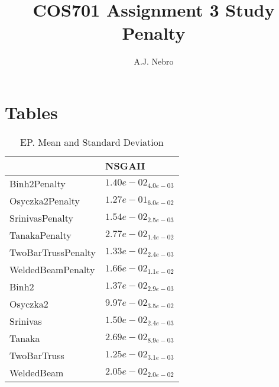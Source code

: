 \documentclass{article}
\title{COS701 Assignment 3 Study Penalty}
\author{A.J. Nebro}
\begin{document}
\maketitle
\section{Tables}

\begin{table}
\caption{EP. Mean and Standard Deviation}
\label{table: EP}
\centering
\begin{scriptsize}
\begin{tabular}{ll}
\hline &  NSGAII\\
\hline 
Binh2Penalty & \cellcolor{gray95}$  1.40e-02_{ 4.0e-03}$ \\
Osyczka2Penalty & \cellcolor{gray95}$  1.27e-01_{ 6.0e-02}$ \\
SrinivasPenalty & \cellcolor{gray95}$  1.54e-02_{ 2.5e-03}$ \\
TanakaPenalty & \cellcolor{gray95}$  2.77e-02_{ 1.4e-02}$ \\
TwoBarTrussPenalty & \cellcolor{gray95}$  1.33e-02_{ 2.4e-03}$ \\
WeldedBeamPenalty & \cellcolor{gray95}$  1.66e-02_{ 1.1e-02}$ \\
Binh2 & \cellcolor{gray95}$  1.37e-02_{ 2.9e-03}$ \\
Osyczka2 & \cellcolor{gray95}$  9.97e-02_{ 3.5e-02}$ \\
Srinivas & \cellcolor{gray95}$  1.50e-02_{ 2.4e-03}$ \\
Tanaka & \cellcolor{gray95}$  2.69e-02_{ 8.9e-03}$ \\
TwoBarTruss & \cellcolor{gray95}$  1.25e-02_{ 3.1e-03}$ \\
WeldedBeam & \cellcolor{gray95}$  2.05e-02_{ 2.0e-02}$ \\
\hline
\end{tabular}
\end{scriptsize}
\end{table}
\end{document}
